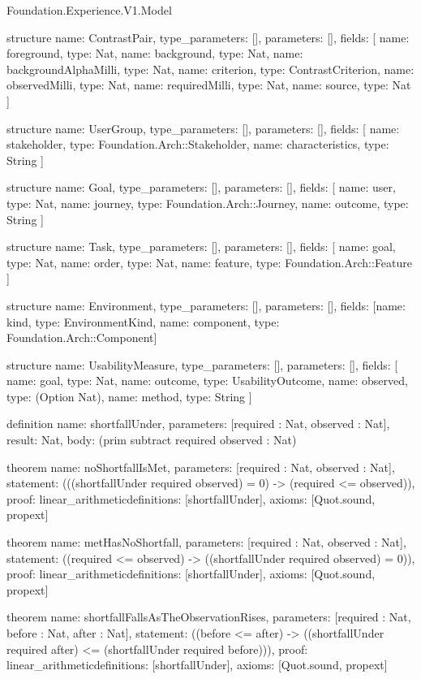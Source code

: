 \begin{lexlean}{Foundation.Experience.V1.Model}
\begin{semanticmodule}
structure{
  name: ContrastPair,
  type_parameters: [],
  parameters: [],
  fields: [
    {name: foreground, type: Nat},
    {name: background, type: Nat},
    {name: backgroundAlphaMilli, type: Nat},
    {name: criterion, type: ContrastCriterion},
    {name: observedMilli, type: Nat},
    {name: requiredMilli, type: Nat},
    {name: source, type: Nat}
  ]
}

structure{
  name: UserGroup,
  type_parameters: [],
  parameters: [],
  fields: [
    {name: stakeholder, type: Foundation.Arch::Stakeholder},
    {name: characteristics, type: String}
  ]
}

structure{
  name: Goal,
  type_parameters: [],
  parameters: [],
  fields: [
    {name: user, type: Nat},
    {name: journey, type: Foundation.Arch::Journey},
    {name: outcome, type: String}
  ]
}

structure{
  name: Task,
  type_parameters: [],
  parameters: [],
  fields: [
    {name: goal, type: Nat},
    {name: order, type: Nat},
    {name: feature, type: Foundation.Arch::Feature}
  ]
}

structure{
  name: Environment,
  type_parameters: [],
  parameters: [],
  fields: [{name: kind, type: EnvironmentKind}, {name: component, type: Foundation.Arch::Component}]
}

structure{
  name: UsabilityMeasure,
  type_parameters: [],
  parameters: [],
  fields: [
    {name: goal, type: Nat},
    {name: outcome, type: UsabilityOutcome},
    {name: observed, type: (Option Nat)},
    {name: method, type: String}
  ]
}

definition{
  name: shortfallUnder,
  parameters: [required : Nat, observed : Nat],
  result: Nat,
  body: (prim subtract required observed : Nat)
}

theorem{
  name: noShortfallIsMet,
  parameters: [required : Nat, observed : Nat],
  statement: (((shortfallUnder required observed) = 0) -> (required <= observed)),
  proof: linear_arithmetic{definitions: [shortfallUnder]},
  axioms: [Quot.sound, propext]
}

theorem{
  name: metHasNoShortfall,
  parameters: [required : Nat, observed : Nat],
  statement: ((required <= observed) -> ((shortfallUnder required observed) = 0)),
  proof: linear_arithmetic{definitions: [shortfallUnder]},
  axioms: [Quot.sound, propext]
}

theorem{
  name: shortfallFallsAsTheObservationRises,
  parameters: [required : Nat, before : Nat, after : Nat],
  statement: ((before <= after) -> ((shortfallUnder required after) <= (shortfallUnder required before))),
  proof: linear_arithmetic{definitions: [shortfallUnder]},
  axioms: [Quot.sound, propext]
}


\end{semanticmodule}
\end{lexlean}
